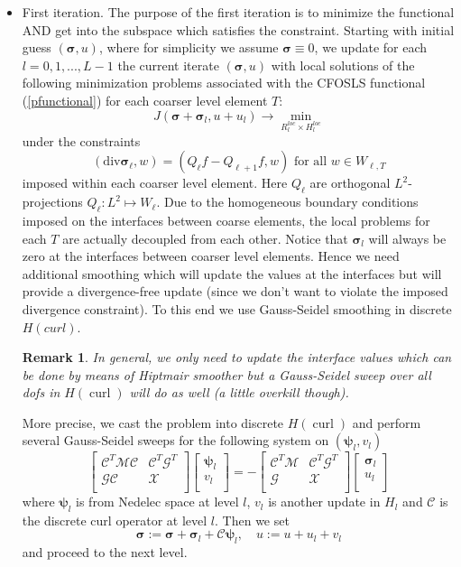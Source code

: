 \documentclass[a4paper,12pt]{amsart}
\numberwithin{equation}{section}
\newtheorem{remark}{Remark}[section]
\newcommand{\curl}{\operatorname{curl}}
\newcommand{\C}{{\mathcal C}}
\newcommand{\G}{{\mathcal G}}
\newcommand{\M}{{\mathcal M}}
\newcommand{\X}{{\mathcal X}}
\def\bpsi{{\boldsymbol \psi}}
\def\bsigma{{\boldsymbol \sigma}}
\begin{document}
\begin{itemize}
	\item First iteration. 
	The purpose of the first iteration is to minimize the functional AND get into the subspace which satisfies the constraint. Starting with initial guess $(\bsigma,u)$, where for simplicity we assume $\bsigma \equiv 0 $, we update for each $l = 0, 1, ..., L - 1$ the current iterate $(\bsigma, u)$ with local solutions of the following minimization problems associated with the CFOSLS functional (\ref{pfunctional}) for each coarser level element $T$:
$$
J(\bsigma + \bsigma_l, u + u_l) \rightarrow \min_{R_l^{loc} \times H_l^{loc}}
$$
under the constraints 
$$
(\mathrm{div} \bsigma_\ell, w )  = (Q_\ell f -Q_{\ell+1}f, w)  \text{ for all } w \in W_{\ell,T}
$$
imposed within each coarser level element.  
Here $Q_\ell$ are orthogonal $L^2$-projections $Q_\ell: L^2 \mapsto W_\ell$. \newline
	Due to the homogeneous boundary conditions imposed on the interfaces between coarse elements, the local problems for each $T$ are actually decoupled from each other.
	Notice that $\bsigma_l$ will always be zero at the interfaces between coarser level elements. Hence we need additional smoothing which will update the values at the interfaces but will provide a divergence-free update (since we don't want to violate the imposed divergence constraint).	To this end we use Gauss-Seidel smoothing in discrete $H(curl)$. 
	\begin{remark}
	In general, we only need to update the interface values which can be done by means of Hiptmair smoother but a Gauss-Seidel sweep over all dofs in $H(\curl)$ will do as well (a little overkill though).
	\end{remark}
	More precise, we cast the problem into discrete $H(\curl)$ and perform several Gauss-Seidel sweeps for the following system on $(\bpsi_l, v_l)$
$$
\begin{bmatrix}
\C^T \M \C & \C^T \G^T  \\
\G \C & \X \\
\end{bmatrix}
\begin{bmatrix}
\bpsi_l \\
v_l \\
\end{bmatrix}
=
-
\begin{bmatrix}
\C^T \M & \C^T \G^T  \\
\G & \X \\
\end{bmatrix}
\begin{bmatrix}
\bsigma_l \\
u_l \\
\end{bmatrix}
$$
where $\bpsi_l$ is from Nedelec space at level $l$, $v_l$ is another update in $H_l$ and $\C$ is the discrete curl operator at level $l$.
	Then we set
$$
 \bsigma := \bsigma + \bsigma_l + \C \bpsi_l, \quad u := u + u_l + v_l
$$	
	and proceed to the next level.


\end{itemize}
\end{document}
